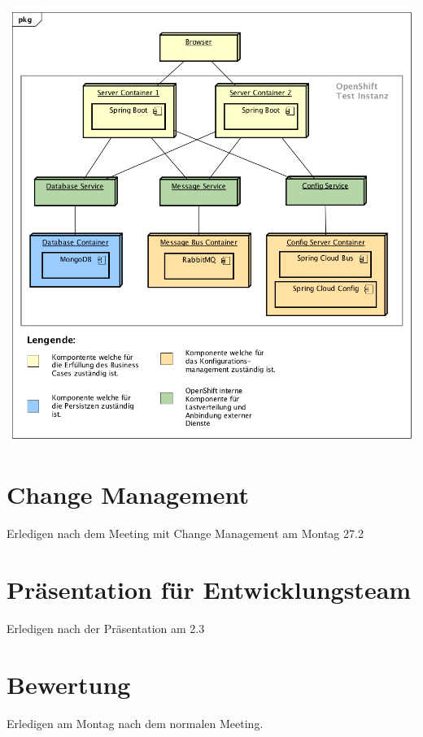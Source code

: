 \begin{center}
	\includegraphics[scale=0.60]{PrototypDeployment.png}
\end{center}

\section{Change Management}

{\color{red} Erledigen nach dem Meeting mit Change Management am Montag 27.2}

\section{Präsentation für Entwicklungsteam}

{\color{red} Erledigen nach der Präsentation am 2.3}

\section{Bewertung}

{\color{red} Erledigen am Montag nach dem normalen Meeting.}










